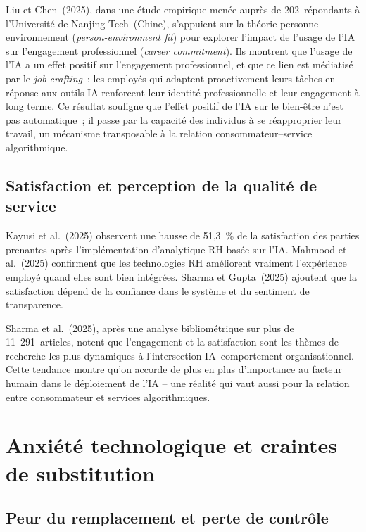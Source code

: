 \documentclass[12pt,a4paper]{article}
\begin{document}
Liu et Chen~(2025), dans une étude empirique menée auprès de 202~répondants à
l'Université de Nanjing Tech~(Chine), s'appuient sur la théorie personne-environnement
(\emph{person-environment fit}) pour explorer l'impact de l'usage de l'IA sur l'engagement
professionnel (\emph{career commitment}). Ils montrent que l'usage de l'IA a un effet
positif sur l'engagement professionnel, et que ce lien est médiatisé par le \emph{job crafting}~:
les employés qui adaptent proactivement leurs tâches en réponse aux outils IA renforcent
leur identité professionnelle et leur engagement à long terme. Ce résultat souligne que
l'effet positif de l'IA sur le bien-être n'est pas automatique~; il passe par la capacité
des individus à se réapproprier leur travail, un mécanisme transposable à la relation
consommateur--service algorithmique.

\subsection{Satisfaction et perception de la qualité de service}

Kayusi et al.~(2025) observent une hausse de 51,3~\% de la satisfaction des parties prenantes
après l'implémentation d'analytique RH basée sur l'IA. Mahmood et al.~(2025) confirment
que les technologies RH améliorent vraiment l'expérience employé quand elles sont bien
intégrées. Sharma et Gupta~(2025) ajoutent que la satisfaction dépend de la confiance
dans le système et du sentiment de transparence.

Sharma et al.~(2025), après une analyse bibliométrique sur plus de 11~291~articles, notent
que l'engagement et la satisfaction sont les thèmes de recherche les plus dynamiques à
l'intersection IA--comportement organisationnel. Cette tendance montre qu'on accorde de
plus en plus d'importance au facteur humain dans le déploiement de l'IA -- une réalité
qui vaut aussi pour la relation entre consommateur et services algorithmiques.

\section{Anxiété technologique et craintes de substitution}

\subsection{Peur du remplacement et perte de contrôle}
\end{document}
